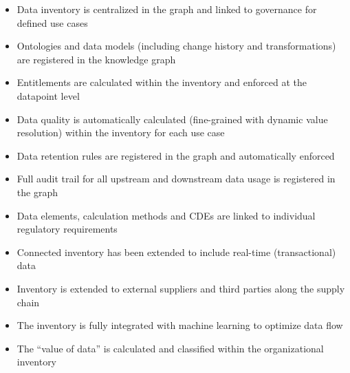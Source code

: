 \kgmmscoringlevelThree

\begin{itemize}[leftmargin=1.5in]
  \item Data inventory is centralized in the graph and linked to governance for defined use cases
  \item Ontologies and data models (including change history and transformations) are registered in the knowledge graph
  \item Entitlements are calculated within the inventory and enforced at the datapoint level
  \item Data quality is automatically calculated (fine-grained with dynamic value resolution) within the inventory
        for each use case
  \item Data retention rules are registered in the graph and automatically enforced
  \item Full audit trail for all upstream and downstream data usage is registered in the graph
  \item Data elements, calculation methods and CDEs are linked to individual regulatory requirements
\end{itemize}

\kgmmscoringlevelFour

\begin{itemize}[leftmargin=1.5in]
  \item Connected inventory has been extended to include real-time (transactional) data
  \item Inventory is extended to external suppliers and third parties along the supply chain
  \item The inventory is fully integrated with machine learning to optimize data flow
  \item The “value of data” is calculated and classified within the organizational inventory
\end{itemize}
